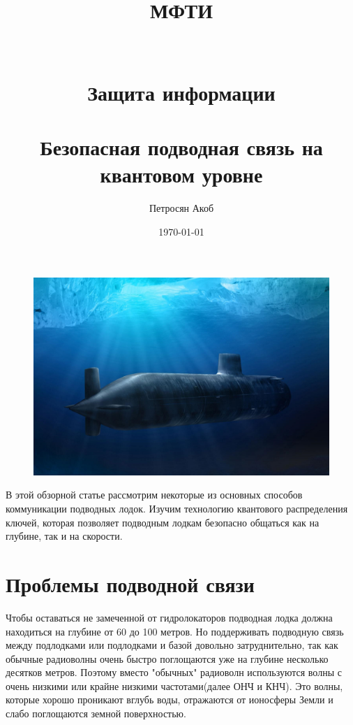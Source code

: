 \documentclass[a4paper,12pt]{article} %
\author{Петросян Акоб}
\title{ МФТИ \\ ~ \\ ~ \\ Защита информации \\ ~ \\ Безопасная подводная связь на квантовом уровне }
\date{\today}
\begin{document}

\maketitle
\newpage

\begin{figure}
  \includegraphics[width=\linewidth]{img/submarine.jpg}
  \label{fig:boat1}
\end{figure}

В этой обзорной статье рассмотрим некоторые из основных способов коммуникации подводных лодок. Изучим технологию квантового распределения ключей, которая позволяет подводным лодкам безопасно общаться как на глубине, так и на скорости.

\section*{Проблемы подводной связи}

\hspace{13pt} Чтобы оставаться не замеченной от гидролокаторов подводная лодка должна находиться на глубине от 60 до 100 метров. Но поддерживать подводную связь между подлодками или подлодками и базой довольно затруднительно, так как обычные радиоволны очень быстро поглощаются уже на глубине несколько десятков метров. Поэтому вместо "обычных" радиоволн используются волны с очень низкими или крайне низкими частотами(далее ОНЧ и КНЧ). Это волны, которые хорошо проникают вглубь воды, отражаются от ионосферы Земли и слабо поглощаются земной поверхностью.
~\\~
\end{document}
